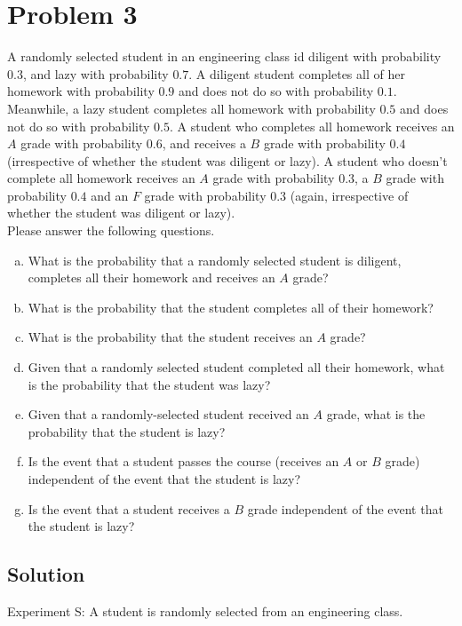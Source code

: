 \section{Problem 3}

A randomly selected student in an engineering class id diligent with probability $0.3$, and lazy with probability $0.7$. A diligent student completes all of her homework with probability $0.9$ and does not do so with probability $0.1$. Meanwhile, a lazy student completes all homework with probability $0.5$ and does not do so with probability $0.5$. A student who completes all homework receives an $A$ grade with probability $0.6$, and receives a $B$ grade with probability $0.4$ (irrespective of whether the student was diligent or lazy). A student who doesn't complete all homework receives an $A$ grade with probability $0.3$, a $B$ grade with probability $0.4$ and an $F$ grade with probability $0.3$ (again, irrespective of whether the student was diligent or lazy).\\
Please answer the following questions.\\

\begin{enumerate}[a.]
	\item What is the probability that a randomly selected student is diligent, completes all their homework and receives an $A$ grade?
	\item What is the probability that the student completes all of their homework?
	\item What is the probability that the student receives an $A$ grade?
	\item Given that a randomly selected student completed all their homework, what is the probability that the student was lazy?
	\item Given that a randomly-selected student received an $A$ grade, what is the probability that the student is lazy?
	\item Is the event that a student passes the course (receives an $A$ or $B$ grade) independent of the event that the student is lazy?
	\item Is the event that a student receives a $B$ grade independent of the event that the student is lazy? 
\end{enumerate}

\subsection{Solution}

Experiment S: A student is randomly selected from an engineering class.

